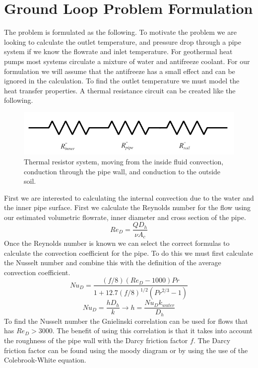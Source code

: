 \section{Ground Loop Problem Formulation}
The problem is formulated as the following. To motivate the problem we are looking to calculate the outlet temperature, and pressure drop through a pipe system if we know the flowrate and inlet temperature. For geothermal heat pumps most systems circulate a mixture of water and antifreeze coolant. For our formulation we will assume that the antifreeze has a small effect and can be ignored in the calculation. To find the outlet temperature we must model the heat transfer properties. A thermal resistance circuit can be created like the following.
%
\begin{figure}[H]
    \centering
    \includegraphics[width=6in]{pictures/Thermal_Resistors.png}
    \caption{Thermal resistor system, moving from the inside fluid convection, conduction through the pipe wall, and conduction to the outside soil.}
\end{figure}
%
\noindent
First we are interested to calculating the internal convection due to the water and the inner pipe surface. First we calculate the Reynolds number for the flow using our estimated volumetric flowrate, inner diameter and cross section of the pipe.
%
\begin{equation}
    { Re }_{ D }=\frac { Q{ D }_{ h } }{ \nu { A }_{ c } } 
\end{equation}
%
Once the Reynolds number is known we can select the correct formulas to calculate the convection coefficient for the pipe. To do this we must first calculate the Nusselt number and combine this with the definition of the average convection coefficient.
%
\begin{equation}
    { N }u_{ D }=\frac { \left( f/8 \right) \left( { Re }_{ D }-1000 \right) Pr }{ 1+12.7(f/8)^{ 1/2 }\left( { Pr }^{ 2/3 }-1 \right)  } 
\end{equation}
%
\begin{equation}
    { N }u_{ D }=\frac { h{ D }_{ h } }{ k } \rightarrow h=\frac { { N }u_{ D }{k}_{water} }{ { D }_{ h } } 
\end{equation}
%
To find the Nusselt number the Gnielinski correlation can be used for flows that has ${ Re }_{ D } > 3000$. The benefit of using this correlation is that it takes into account the roughness of the pipe wall with the Darcy friction factor $f$. The Darcy friction factor can be found using the moody diagram or by using the use of the Colebrook-White equation.
